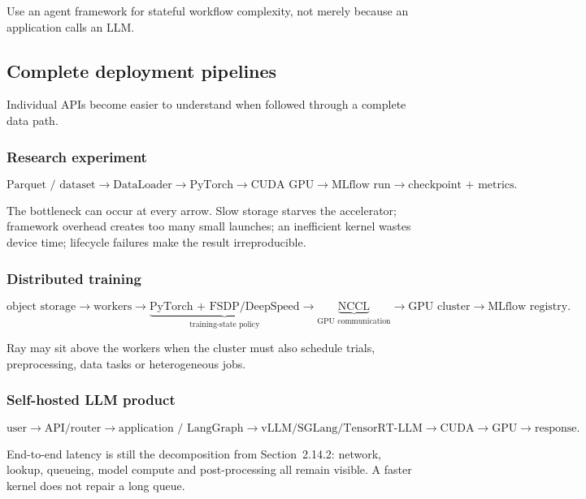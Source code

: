 \begin{calloutmemoryhook}
Use an agent framework for stateful workflow complexity, not merely because an application calls an LLM.
\end{calloutmemoryhook}


\subsection{Complete deployment pipelines}

Individual APIs become easier to understand when followed through a complete data path.

\subsubsection*{Research experiment}

\[
\text{Parquet / dataset}
\rightarrow
\text{DataLoader}
\rightarrow
\text{PyTorch}
\rightarrow
\text{CUDA GPU}
\rightarrow
\text{MLflow run}
\rightarrow
\text{checkpoint + metrics}.
\]

The bottleneck can occur at every arrow.
Slow storage starves the accelerator; framework overhead creates too many small launches; an inefficient kernel wastes device time; lifecycle failures make the result irreproducible.

\subsubsection*{Distributed training}

\[
\text{object storage}
\rightarrow
\text{workers}
\rightarrow
\underbrace{\text{PyTorch + FSDP/DeepSpeed}}_{\text{training-state policy}}
\rightarrow
\underbrace{\text{NCCL}}_{\text{GPU communication}}
\rightarrow
\text{GPU cluster}
\rightarrow
\text{MLflow registry}.
\]

Ray may sit above the workers when the cluster must also schedule trials, preprocessing, data tasks or heterogeneous jobs.

\subsubsection*{Self-hosted LLM product}

\[
\text{user}
\rightarrow
\text{API/router}
\rightarrow
\text{application / LangGraph}
\rightarrow
\text{vLLM/SGLang/TensorRT-LLM}
\rightarrow
\text{CUDA}
\rightarrow
\text{GPU}
\rightarrow
\text{response}.
\]

End-to-end latency is still the decomposition from Section~2.14.2:
network, lookup, queueing, model compute and post-processing all remain visible.
A faster kernel does not repair a long queue.

